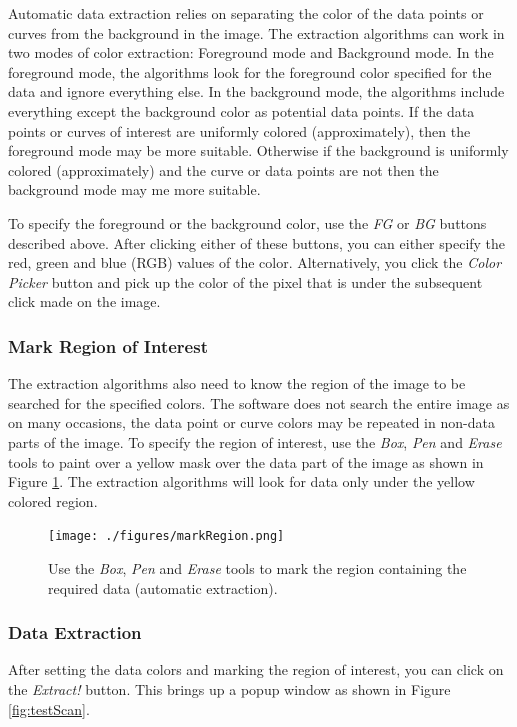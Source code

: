 \documentclass[letterpaper, 10pt]{article}
\begin{document}
Automatic data extraction relies on separating the color of the data points or curves from the background in the image. The extraction algorithms can work in two modes of color extraction: Foreground mode and Background mode. In the foreground mode, the algorithms look for the foreground color specified for the data and ignore everything else. In the background mode, the algorithms include everything except the background color as potential data points. If the data points or curves of interest are uniformly colored (approximately), then the foreground mode may be more suitable. Otherwise if the background is uniformly colored (approximately) and the curve or data points are not then the background mode may me more suitable.

To specify the foreground or the background color, use the \emph{FG} or \emph{BG} buttons described above. After clicking either of these buttons, you can either specify the red, green and blue (RGB) values of the color. Alternatively, you click the \emph{Color Picker} button and pick up the color of the pixel that is under the subsequent click made on the image.
\subsubsection{Mark Region of Interest}
The extraction algorithms also need to know the region of the image to be searched for the specified colors. The software does not search the entire image as on many occasions, the data point or curve colors may be repeated in non-data parts of the image. To specify the region of interest, use the \emph{Box}, \emph{Pen} and \emph{Erase} tools to paint over a yellow mask over the data part of the image as shown in Figure \ref{fig:markRegion}. The extraction algorithms will look for data only under  the yellow colored region. 
\begin{figure}
\begin{center}
\texttt{[image: ./figures/markRegion.png]}
\caption{Use the \emph{Box}, \emph{Pen} and \emph{Erase} tools to mark the region containing the required data (automatic extraction).}
\label{fig:markRegion}
\end{center}
\end{figure}

\subsubsection{Data Extraction}
After setting the data colors and marking the region of interest, you can click on the \emph{Extract!} button. This brings up a popup window as shown in Figure \ref{fig:testScan}. 
\end{document}
